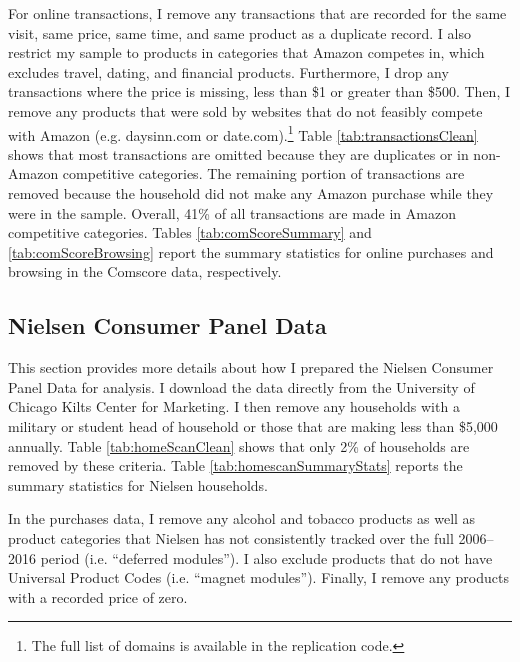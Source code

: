 \documentclass[AEJ,reviewmode]{AEA}
\begin{document}




For online transactions, I remove any transactions that are recorded for the same visit, same price, same time, and same product as a duplicate record. I also restrict my sample to products in categories that Amazon competes in, which excludes travel, dating, and financial products. Furthermore, I drop any transactions where the price is missing, less than \$1 or greater than \$500. Then, I remove any products that were sold by websites that do not feasibly compete with Amazon (e.g. daysinn.com or date.com).\footnote{The full list of domains is available in the replication code.} Table \ref{tab:transactionsClean} shows that most transactions are omitted because they are duplicates or in non-Amazon competitive categories. The remaining portion of transactions are removed because the household did not make any Amazon purchase while they were in the sample. Overall, 41\% of all transactions are made in Amazon competitive categories. Tables \ref{tab:comScoreSummary} and \ref{tab:comScoreBrowsing} report the summary statistics for online purchases and browsing in the Comscore data, respectively.







\subsection{Nielsen Consumer Panel Data}
This section provides more details about how I prepared the Nielsen Consumer Panel Data for analysis. I download the data directly from the University of Chicago Kilts Center for Marketing. I then remove any households with a military or student head of household or those that are making less than \$5,000 annually. Table \ref{tab:homeScanClean} shows that only 2\% of households are removed by these criteria. Table \ref{tab:homescanSummaryStats} reports the summary statistics for Nielsen households.





In the purchases data, I remove any alcohol and tobacco products as well as product categories that Nielsen has not consistently tracked over the full 2006--2016 period (i.e. ``deferred modules''). I also exclude products that do not have Universal Product Codes (i.e. ``magnet modules''). Finally, I remove any products with a recorded price of zero.
\end{document}
